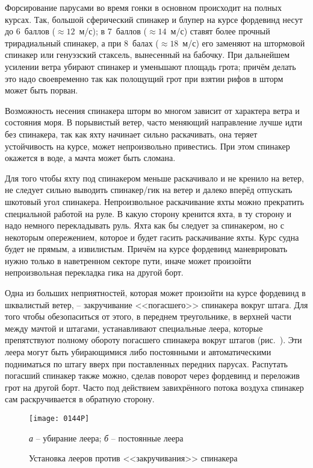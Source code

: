 Форсирование парусами во время гонки в основном происходит на полных
курсах. Так, большой сферический спинакер и блупер на курсе фордевинд
несут до 6~баллов ($\approx 12$~м/с); в 7~баллов ($\approx 14$~м/с)
ставят более прочный трирадиальный спинакер, а при 8~балах
($\approx 18$~м/с) его заменяют на штормовой спинакер или генуэзский
стаксель, вынесенный на бабочку. При дальнейшем усилении ветра убирают
спинакер и уменьшают площадь грота; причём делать это надо
своевременно так как полощущий грот при взятии рифов в шторм может
быть порван.

Возможность несения спинакера шторм во многом зависит от характера
ветра и состояния моря. В порывистый ветер, часто меняющий направление
лучше идти без спинакера, так как яхту начинает сильно раскачивать,
она теряет устойчивость на курсе, может непроизвольно привестись. При
этом спинакер окажется в воде, а мачта может быть сломана.

Для того чтобы яхту под спинакером меньше раскачивало и не кренило на
ветер, не следует сильно выводить спинакер\-/гик на ветер и далеко
вперёд отпускать шкотовый угол спинакера. Непроизвольное раскачивание
яхты можно прекратить специальной работой на руле. В какую сторону
кренится яхта, в ту сторону и надо немного перекладывать руль. Яхта
как бы следует за спинакером, но с некоторым опережением, которое и
будет гасить раскачивание яхты. Курс судна будет не прямым, а
извилистым. Причём на курсе фордевинд маневрировать нужно только в
наветренном секторе пути, иначе может произойти непроизвольная
перекладка гика на другой борт.

Одна из больших неприятностей, которая может произойти на курсе
фордевинд в шквалистый ветер, \--- закручивание <<погасшего>>
спинакера вокруг штага. Для того чтобы обезопаситься от этого, в
переднем треугольнике, в верхней части между мачтой и штагами,
устанавливают специальные леера, которые препятствуют полному обороту
погасшего спинакера вокруг штагов (рис.~). Эти леера могут
быть убирающимися либо постоянными и автоматическими подниматься по
штагу вверх при поставленных передних парусах. Распутать погасший
спинакер также можно, сделав поворот через фордевинд и переложив грот
на другой борт. Часто под действием завихрённого потока воздуха
спинакер сам раскручивается в обратную сторону.

\begin{figure*}[!htb]
  \centering{}
  \texttt{[image: 0144P]}
  \caption{Установка лееров против <<закручивания>> спинакера}
  \label{fig:144}
  \small
  \centering{}
  \textit{а} \--- убирание леера; \textit{б} \--- постоянные леера
\end{figure*}

